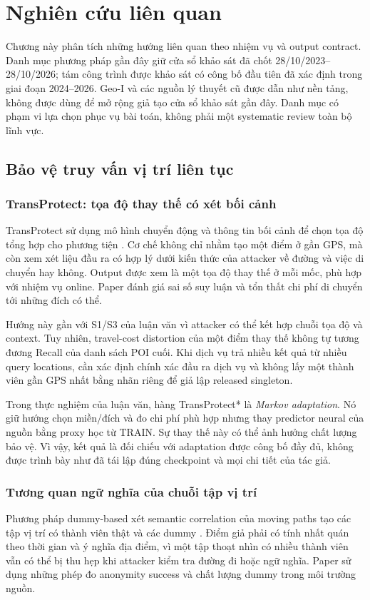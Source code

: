 \chapter{Nghiên cứu liên quan}\label{ch:related}
Chương này phân tích những hướng liên quan theo nhiệm vụ và output contract. Danh mục phương pháp
gần đây giữ cửa sổ khảo sát đã chốt 28/10/2023--28/10/2026; tám công trình được
khảo sát có công bố đầu tiên đã xác định trong giai đoạn 2024--2026. Geo-I và các nguồn lý thuyết cũ
được dẫn như nền tảng, không được dùng để mở rộng giả tạo cửa sổ khảo sát gần đây. Danh mục có phạm
vi lựa chọn phục vụ bài toán, không phải một systematic review toàn bộ lĩnh vực.

\section{Bảo vệ truy vấn vị trí liên tục}
\subsection{TransProtect: tọa độ thay thế có xét bối cảnh}
TransProtect sử dụng mô hình chuyển động và thông tin bối cảnh để chọn tọa độ tổng hợp cho phương
tiện \cite{transprotect}. Cơ chế không chỉ nhằm tạo một điểm ở gần GPS, mà còn xem xét liệu đầu ra
có hợp lý dưới kiến thức của attacker về đường và việc di chuyển hay không. Output được xem là một
tọa độ thay thế ở mỗi mốc, phù hợp với nhiệm vụ online. Paper đánh giá sai số suy luận và tổn thất
chi phí di chuyển tới những đích có thể.

Hướng này gần với S1/S3 của luận văn vì attacker có thể kết hợp chuỗi tọa độ và context. Tuy nhiên,
travel-cost distortion của một điểm thay thế không tự tương đương Recall của danh sách POI cuối.
Khi dịch vụ trả nhiều kết quả từ nhiều query locations, cần xác định chính xác đầu ra dịch vụ và
không lấy một thành viên gần GPS nhất bằng nhãn riêng để giả lập released singleton.

Trong thực nghiệm của luận văn, hàng TransProtect* là \emph{Markov adaptation}. Nó giữ hướng chọn
miền/đích và đo chi phí phù hợp nhưng thay predictor neural của nguồn bằng proxy học từ TRAIN.
Sự thay thế này có thể ảnh hưởng chất lượng bảo vệ. Vì vậy, kết quả là đối chiếu với adaptation được
công bố đầy đủ, không được trình bày như đã tái lập đúng checkpoint và mọi chi tiết của tác giả.

\subsection{Tương quan ngữ nghĩa của chuỗi tập vị trí}
Phương pháp dummy-based xét semantic correlation của moving paths tạo các tập vị trí có thành viên
thật và các dummy \cite{semantic}. Điểm giả phải có tính nhất quán theo thời gian và ý nghĩa địa điểm,
vì một tập thoạt nhìn có nhiều thành viên vẫn có thể bị thu hẹp khi attacker kiểm tra đường đi hoặc
ngữ nghĩa. Paper sử dụng những phép đo anonymity success và chất lượng dummy trong môi trường nguồn.

